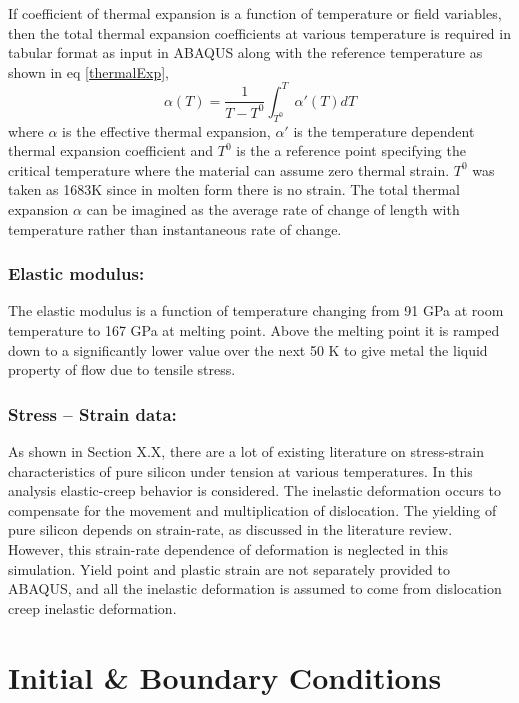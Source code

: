 If coefficient of thermal expansion is a function of temperature or field variables, then the total thermal expansion coefficients at various temperature is required in tabular format as input in ABAQUS along with the reference temperature as shown in eq \ref{thermalExp},
\begin{equation}
\alpha(T) = \frac{1}{T-T^{0}}\int_{T^{0}}^{T} {\alpha}'(T)dT
\label {thermalExp}
\end{equation}
where $\alpha$ is the effective thermal expansion, ${\alpha}'$ is the temperature dependent thermal expansion coefficient and $T^{0}$ is the a reference point specifying the critical temperature where the material can assume zero thermal strain. $T^{0}$ was taken as 1683K since in molten form there is no strain. The total thermal expansion $\alpha$ can be imagined as the average rate of change of length with temperature rather than instantaneous rate of change.  

\subsubsection{Elastic modulus:}

The elastic modulus is a function of temperature changing from 91 GPa at room temperature to 167 GPa at melting point. Above the melting point it is ramped down to a significantly lower value over the next 50 K to give metal the liquid property of flow due to tensile stress.

\subsubsection{Stress – Strain data:}

As shown in Section X.X, there are a lot of existing literature on stress-strain characteristics of pure silicon under tension at various temperatures. In this analysis elastic-creep behavior is considered. The inelastic deformation occurs to compensate for the movement and multiplication of dislocation. The yielding of pure silicon depends on strain-rate, as discussed in the literature review. However, this strain-rate dependence of deformation is neglected in this simulation. Yield point and plastic strain are not separately provided to ABAQUS, and all the inelastic deformation is assumed to come from dislocation creep inelastic deformation.  


\section{Initial \& Boundary Conditions}


